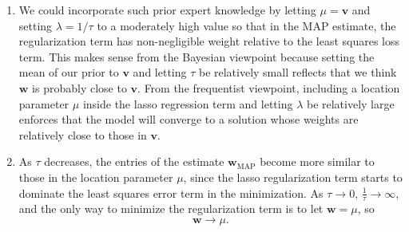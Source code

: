 \documentclass[submit]{harvardml}
\begin{document}
\begin{enumerate}
	\item We could incorporate such prior expert knowledge by letting $\mu = \mathbf{v}$ and setting $\lambda = 1/\tau$ to a moderately high value so that in the MAP estimate, the regularization term has non-negligible weight relative to the least squares loss term. This makes sense from the Bayesian viewpoint because setting the mean of our prior to $\mathbf{v}$ and letting $\tau$ be relatively small reflects that we think $\mathbf{w}$ is probably close to $\textbf{v}$. From the frequentist viewpoint, including a location parameter $\mu$ inside the lasso regression term and letting $\lambda$ be relatively large enforces that the model will converge to a solution whose weights are relatively close to those in $\mathbf{v}$.
	
	\item As $\tau$ decreases, the entries of the estimate $\mathbf{w}_{\mathrm{MAP}}$ become more similar to those in the location parameter $\mu$, since the lasso regularization term starts to dominate the least squares error term in the minimization. As $\tau \to 0$, $\frac{1}{\tau} \to \infty$, and the only way to minimize the regularization term is to let $\mathbf{w} = \mu$, so
	$$\mathbf{w} \to \mu.$$
	

\end{enumerate}
\end{document}
